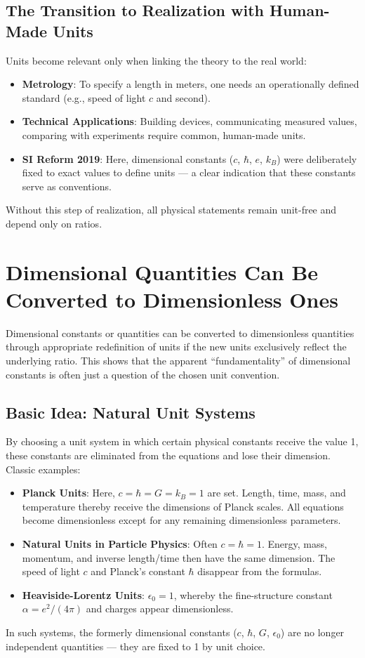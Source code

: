 	\subsection{The Transition to Realization with Human-Made Units}
	Units become relevant only when linking the theory to the real world:
	\begin{itemize}
		\item \textbf{Metrology}: To specify a length in meters, one needs an operationally defined standard (e.g., speed of light $c$ and second).
		\item \textbf{Technical Applications}: Building devices, communicating measured values, comparing with experiments require common, human-made units.
		\item \textbf{SI Reform 2019}: Here, dimensional constants ($c$, $\hbar$, $e$, $k_B$) were deliberately fixed to exact values to define units --- a clear indication that these constants serve as conventions.
	\end{itemize}
	Without this step of realization, all physical statements remain unit-free and depend only on ratios.
	
	\section{Dimensional Quantities Can Be Converted to Dimensionless Ones}
	Dimensional constants or quantities can be converted to dimensionless quantities through appropriate redefinition of units if the new units exclusively reflect the underlying ratio. This shows that the apparent ``fundamentality'' of dimensional constants is often just a question of the chosen unit convention.
	
	\subsection{Basic Idea: Natural Unit Systems}
	By choosing a unit system in which certain physical constants receive the value 1, these constants are eliminated from the equations and lose their dimension.
	Classic examples:
	\begin{itemize}
		\item \textbf{Planck Units}: Here, $c = \hbar = G = k_B = 1$ are set.
		Length, time, mass, and temperature thereby receive the dimensions of Planck scales. All equations become dimensionless except for any remaining dimensionless parameters.
		\item \textbf{Natural Units in Particle Physics}: Often $c = \hbar = 1$.
		Energy, mass, momentum, and inverse length/time then have the same dimension. The speed of light $c$ and Planck's constant $\hbar$ disappear from the formulas.
		\item \textbf{Heaviside-Lorentz Units}: $\epsilon_0 = 1$, whereby the fine-structure constant $\alpha = e^2/(4\pi)$ and charges appear dimensionless.
	\end{itemize}
	In such systems, the formerly dimensional constants ($c$, $\hbar$, $G$, $\epsilon_0$) are no longer independent quantities --- they are fixed to 1 by unit choice.
	
